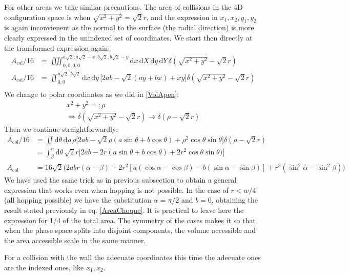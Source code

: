 \documentclass[superscriptaddress,pre,reprint,showpacs,onecolumn]{revtex4-1}
\newcommand{\rd}[1]{\mathrm{d}{#1} \,}
\begin{document}
  
  For other areas we take similar precautions. The area of collisions in
  the 4D configuration space is when $\sqrt{x^2+y^2}=\sqrt{2}r$, and the expression
  in $x_1,x_2,y_1,y_2$ is again inconvienent as the normal to the surface (the
  radial direction) is more clearly expressed in the unindexed set of
  coordinates. We start then directly at the transformed expression again:
  \begin{align}
    A_\text{col}/16 & =\iiiint _{0,0,0,0}^{a\sqrt{2},a\sqrt{2}-x,b\sqrt{2},b\sqrt{2}-y}
    \rd x \rd X \rd y \rd Y
    \delta (\sqrt{x^2+y^2}-\sqrt{2}r)\\
    A_\text{col}/16 & =\iint _{0,0}^{a\sqrt{2},b\sqrt{2}}
    \rd x \rd y 
   \bigl[ 2ab-\sqrt{2}(ay+bx)+xy \bigr]
    \delta (\sqrt{x^2+y^2}-\sqrt{2}r)\\
    \end{align}
  We change to polar coordinates as we did in \ref{VolApen}:
  \begin{align}
    x^2+y^2 =: \rho \\   \Rightarrow   \delta(\sqrt{x^2+y^2}-\sqrt{2}r) \rightarrow
    \delta(\rho-\sqrt{2}r)   
    \end{align}
  Then we continue straightforwardly:
    \begin{align}
    A_\text{col}/16 & =\iint 
    \rd \theta \rd \rho \rho
    \bigl[2ab-\sqrt{2}\rho(a\sin\theta+b\cos\theta)+\rho^2\cos\theta\sin\theta
      \bigr]
    \delta(\rho-\sqrt{2}r) \\
    &=\int_\beta^\alpha \rd \theta \sqrt{2}r
    \bigl[
      2ab-2r(a\sin\theta+b\cos\theta)+2r^2\cos\theta\sin\theta)
      \bigr] \\
    A_\text{col} & = 16\sqrt{2} \bigl( 2abr(\alpha-\beta)
    + 2r^2 [a (\cos \alpha-\cos\beta) -b (\sin\alpha -\sin\beta)]
     + r^3(\sin^2 \alpha -\sin^2\beta) \bigr)
    \end{align}
    We have used the same trick as in previous subsection to obtain a general expression
    that works even when hopping is not possible. In the case of $r<w/4$ (all hopping possible)
    we have the substitution $\alpha=\pi/2$ and $b=0$, obtaining the result stated previously
    in eq. \ref{AreaChoque}. It is practical to leave here the expression for 1/4 of the
    total area. The symmetry of the cases makes it so that when the phase space splits
    into disjoint components, the volume accessible and the area accessible scale in
    the same manner.
    

    For a collision with the wall the adecuate coordinates this time the
    adecuate ones are the indexed ones, like $x_1, x_2$.
\end{document}
